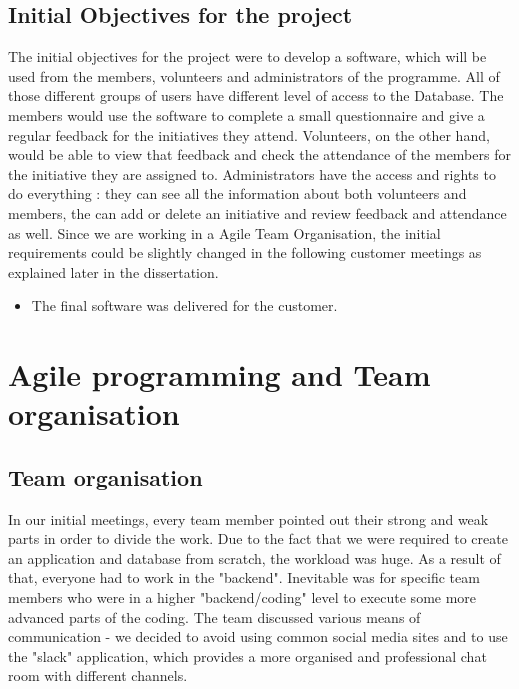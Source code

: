 \documentclass{l3proj}
\begin{document}
\subsection{Initial Objectives for the project}
\label{objectives}

The initial objectives for the project were to develop a software, which will be used from the members, volunteers and administrators of the programme. All of those different groups of users have different level of access to the Database. The members would use the software to  complete a small questionnaire and give a regular feedback for the initiatives they attend. Volunteers, on the other hand, would be able to view that feedback and check the attendance of the members for the initiative they are assigned to. Administrators have the access and rights to do everything : they can see all the information about both volunteers and members, the can add or delete an initiative and review feedback and attendance as well. Since we are working in a Agile Team Organisation, the initial requirements could be slightly changed in the following customer meetings as explained later in the dissertation.
\begin{itemize}
\item The final software was delivered for the customer.
\end{itemize}

\section{Agile programming and Team organisation}

\subsection{Team organisation}
\label{organisation}

In our initial meetings, every team member pointed out their strong and weak parts in order to divide the work. Due to the fact that we were required to create an application and database from scratch, the workload was huge. As a result of that, everyone had to work in the "backend". Inevitable was for specific team members who were in a higher "backend/coding" level to execute some more advanced parts of the coding.
The team discussed various means of communication - we decided to avoid using common social media sites and to use the "slack" application, which provides a more organised and professional chat room with different channels. 
\end{document}
